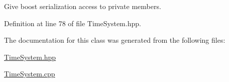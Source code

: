 Give boost serialization access to private members. 



Definition at line 78 of file Time\+System.\+hpp.



The documentation for this class was generated from the following files\+:\begin{DoxyCompactItemize}
\item 
\hyperlink{TimeSystem_8hpp}{Time\+System.\+hpp}\item 
\hyperlink{TimeSystem_8cpp}{Time\+System.\+cpp}\end{DoxyCompactItemize}
